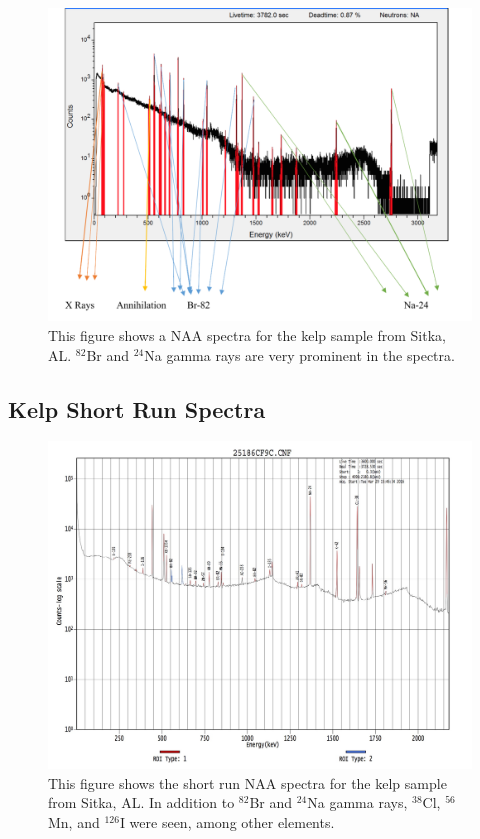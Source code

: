 \documentclass[]{article}
\begin{document}
\begin{figure}[h]
\centering
\includegraphics[scale=0.5]{ExampleSpectra}
\caption{This figure shows a NAA spectra for the kelp sample from Sitka, AL. $^{82}$Br and $^{24}$Na gamma rays are very prominent in the spectra.}
\end{figure} 

\subsection{Kelp Short Run Spectra}
\begin{figure}[h]
\centering
\includegraphics[scale=0.2]{SampleB}
\caption{This figure shows the short run NAA spectra for the kelp sample from Sitka, AL. In addition to $^{82}$Br and $^{24}$Na gamma rays, $^{38}$Cl, $^{56}$Mn, and $^{126}$I were seen, among other elements.}
\end{figure} 
\end{document}
